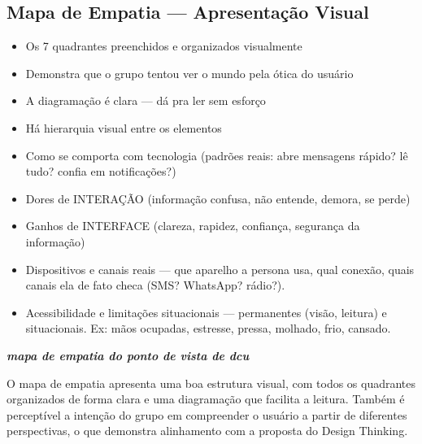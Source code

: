 \documentclass[
  sigconf,
  nonacm, %
  language=portuguese
]{acmart}
\newcommand{\statuswarn}[1]{{\small\bfseries\color{cwarn}#1}}
\begin{document}
\subsection{Mapa de Empatia — Apresentação Visual}

\noindent\statuswarn{0,85\,/\,1,50 pts · Completo c/ ressalvas}

\begin{itemize}[leftmargin=14pt,itemsep=1pt,topsep=3pt,parsep=0pt]
  \item[\textcolor{cgood}{$\checkmark$}] {\small\textcolor{cgood}{Os 7 quadrantes preenchidos e organizados visualmente}}
  \item[\textcolor{cgood}{$\checkmark$}] {\small\textcolor{cgood}{Demonstra que o grupo tentou ver o mundo pela ótica do usuário}}
  \item[\textcolor{cgood}{$\checkmark$}] {\small\textcolor{cgood}{A diagramação é clara — dá pra ler sem esforço}}
  \item[\textcolor{cgood}{$\checkmark$}] {\small\textcolor{cgood}{Há hierarquia visual entre os elementos}}
  \item[\textcolor{cgood}{$\checkmark$}] {\small\textcolor{cgood}{Como se comporta com tecnologia (padrões reais: abre mensagens rápido? lê tudo? confia em notificações?)}}
  \item[\textcolor{cgood}{$\checkmark$}] {\small\textcolor{cgood}{Dores de INTERAÇÃO (informação confusa, não entende, demora, se perde)}}
  \item[\textcolor{cgood}{$\checkmark$}] {\small\textcolor{cgood}{Ganhos de INTERFACE (clareza, rapidez, confiança, segurança da informação)}}
  \item[$\square$] {\small\textcolor{cmuted}{Dispositivos e canais reais — que aparelho a persona usa, qual conexão, quais canais ela de fato checa (SMS? WhatsApp? rádio?).}}
  \item[$\square$] {\small\textcolor{cmuted}{Acessibilidade e limitações situacionais — permanentes (visão, leitura) e situacionais. Ex: mãos ocupadas, estresse, pressa, molhado, frio, cansado.}}
\end{itemize}

\textit{\textbf{mapa de empatia do ponto de vista de dcu}}

O mapa de empatia apresenta uma boa estrutura visual, com todos os quadrantes organizados de forma clara e uma diagramação que facilita a leitura. Também é perceptível a intenção do grupo em compreender o usuário a partir de diferentes perspectivas, o que demonstra alinhamento com a proposta do Design Thinking.
\end{document}

